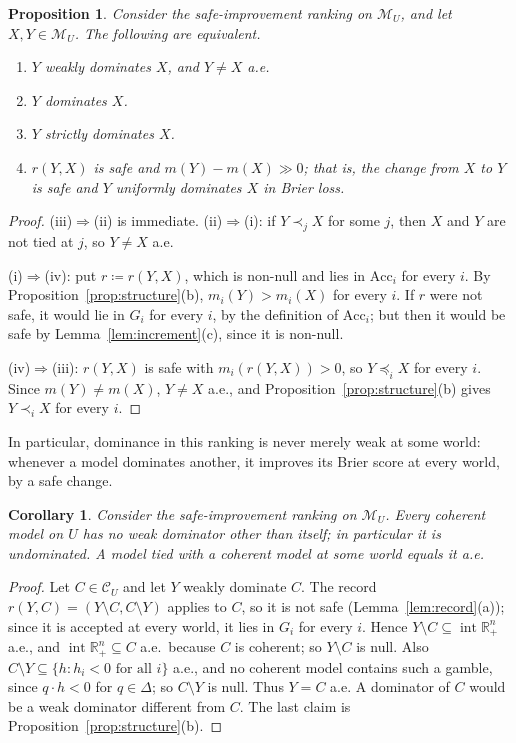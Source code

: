 \documentclass[11pt]{article}
\newcommand{\R}{\mathbb{R}}
\newcommand{\M}{\mathcal{M}}
\newcommand{\CC}{\mathcal{C}}
\newcommand{\Acc}{\mathrm{Acc}}
\newcommand{\Rpp}{\inter\R^n_{+}}
\DeclareMathOperator{\inter}{int}
\theoremstyle{plain}
\newtheorem{proposition}[theorem]{Proposition}
\newtheorem{corollary}[theorem]{Corollary}
\theoremstyle{definition}
\theoremstyle{remark}
\begin{document}
\begin{proposition}\label{prop:dominance}
Consider the safe-improvement ranking on $\M_U$, and let $X,Y\in\M_U$. The following are
equivalent.
\begin{enumerate}[label=(\roman*)]
  \item $Y$ weakly dominates $X$, and $Y\ne X$ a.e.
  \item $Y$ dominates $X$.
  \item $Y$ strictly dominates $X$.
  \item $r(Y,X)$ is safe and $m(Y)-m(X)\gg0$; that is, the change from $X$ to $Y$ is safe
  and $Y$ uniformly dominates $X$ in Brier loss.
\end{enumerate}
\end{proposition}

\begin{proof}
(iii)$\Rightarrow$(ii) is immediate. (ii)$\Rightarrow$(i): if $Y\prec_jX$ for some $j$,
then $X$ and $Y$ are not tied at $j$, so $Y\ne X$ a.e.

(i)$\Rightarrow$(iv): put $r\coloneqq r(Y,X)$, which is non-null and lies in $\Acc_i$ for
every $i$. By Proposition~\ref{prop:structure}(b), $m_i(Y)>m_i(X)$ for every $i$. If $r$
were not safe, it would lie in $G_i$ for every $i$, by the definition of $\Acc_i$; but
then it would be safe by Lemma~\ref{lem:increment}(c), since it is non-null.

(iv)$\Rightarrow$(iii): $r(Y,X)$ is safe with $m_i(r(Y,X))>0$, so $Y\preceq_iX$ for every
$i$. Since $m(Y)\ne m(X)$, $Y\ne X$ a.e., and Proposition~\ref{prop:structure}(b) gives
$Y\prec_iX$ for every $i$.
\end{proof}

In particular, dominance in this ranking is never merely weak at some world: whenever a
model dominates another, it improves its Brier score at every world, by a safe change.

\begin{corollary}\label{cor:protect}
Consider the safe-improvement ranking on $\M_U$. Every coherent model on $U$ has no weak
dominator other than itself; in particular it is undominated. A model tied with a coherent
model at some world equals it a.e.
\end{corollary}

\begin{proof}
Let $C\in\CC_U$ and let $Y$ weakly dominate $C$. The record $r(Y,C)=(Y\setminus C,
C\setminus Y)$ applies to $C$, so it is not safe (Lemma~\ref{lem:record}(a)); since it is
accepted at every world, it lies in $G_i$ for every $i$. Hence $Y\setminus C\subseteq
\Rpp$ a.e., and $\Rpp\subseteq C$ a.e.\ because $C$ is coherent; so $Y\setminus C$ is
null. Also $C\setminus Y\subseteq\{h:h_i<0\text{ for all }i\}$ a.e., and no coherent model
contains such a gamble, since $q\cdot h<0$ for $q\in\Delta$; so $C\setminus Y$ is null.
Thus $Y=C$ a.e. A dominator of $C$ would be a weak dominator different from $C$. The last
claim is Proposition~\ref{prop:structure}(b).
\end{proof}
\end{document}
